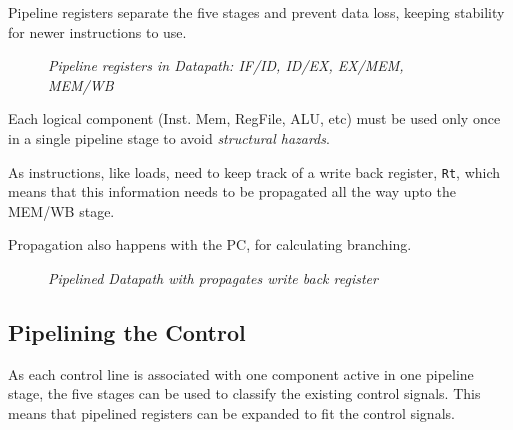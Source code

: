 \documentclass[11pt]{article}
\begin{document}
Pipeline registers separate the five stages and prevent data loss, keeping stability for newer instructions to use.

\begin{figure}[htbp]
    \centering
    \caption{\textit{Pipeline registers in Datapath: IF/ID, ID/EX, EX/MEM, MEM/WB}}
\end{figure}

Each logical component (Inst. Mem, RegFile, ALU, etc) must be used only once in a single pipeline stage to avoid \textit{structural hazards}.

As instructions, like loads, need to keep track of a write back register, \texttt{Rt}, which means that this information needs to be propagated all the way upto the MEM/WB stage.

Propagation also happens with the PC, for calculating branching.

\begin{figure}[htbp]
    \centering
    \caption{\textit{Pipelined Datapath with propagates write back register}}
\end{figure}

\subsection*{Pipelining the Control}

As each control line is associated with one component active in one pipeline stage, the five stages can be used to classify the existing control signals. This means that pipelined registers can be expanded to fit the control signals.
\end{document}

